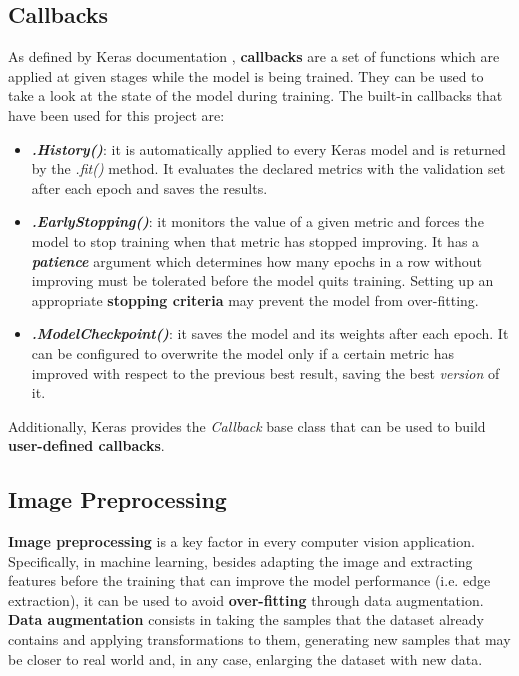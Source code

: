 \subsection{Callbacks} \label{subsec:callbacks}
As defined by Keras documentation \cite{chollet2015keras}, \textbf{callbacks} are a set of functions which are applied at given stages while the model is being trained. They can be used to take a look at the state of the model during training. The built-in callbacks that have been used for this project are:
\begin{itemize}
	\item \textbf{\textit{.History()}}: it is automatically applied to every Keras model and is returned by the \textit{.fit()} method. It evaluates the declared metrics with the validation set after each epoch and saves the results.
	
	\item \textbf{\textit{.EarlyStopping()}}: it monitors the value of a given metric and forces the model to stop training when that metric has stopped improving. It has a \textbf{\textit{patience}} argument which determines how many epochs in a row without improving must be tolerated before the model quits training. Setting up an appropriate \textbf{stopping criteria} may prevent the model from over-fitting.
	
	\item \textbf{\textit{.ModelCheckpoint()}}: it saves the model and its weights after each epoch. It can be configured to overwrite the model only if a certain metric has improved with respect to the previous best result, saving the best \textit{version} of it.
\end{itemize}

Additionally, Keras provides the \textit{Callback} base class that can be used to build \textbf{user-defined callbacks}.

\subsection{Image Preprocessing}\label{subsec:utils}
\textbf{Image preprocessing} is a key factor in every computer vision application. Specifically, in machine learning, besides adapting the image and extracting features before the training that can improve the model performance (i.e. edge extraction), it can be used to avoid \textbf{over-fitting} through data augmentation. \textbf{Data augmentation} \cite{DBLP:journals/corr/WongGSM16} consists in taking the samples that the dataset already contains and applying transformations to them, generating new samples that may be closer to real world and, in any case, enlarging the dataset with new data.

